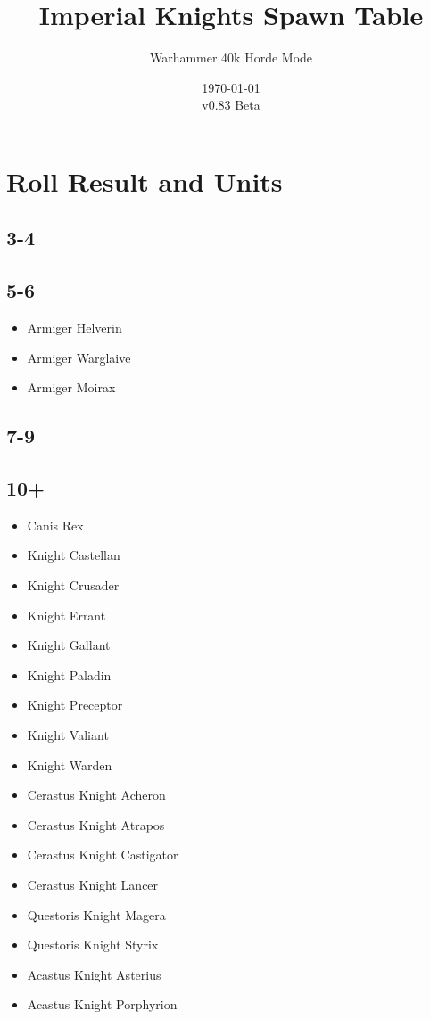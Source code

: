 \documentclass{HordeModeTarot}
\title{Imperial Knights Spawn Table}
\author{Warhammer 40k Horde Mode}
\date{\today \\v0.83 Beta}
\begin{document}
\maketitle

\outputUsingSpawnTableBoilerplate
\section{Roll Result and Units}\hypertarget{roll-results}{}\label{roll-results}

\begin{multicols}{2}

\subsection*{3-4}

\subsection*{5-6}

\begin{itemize}[leftmargin=*]
\item[] Armiger Helverin
\item[] Armiger Warglaive
\item[] Armiger Moirax
\end{itemize}

\subsection*{7-9}

\subsection*{10+}

\begin{itemize}[leftmargin=*]
\item[] Canis Rex
\item[] Knight Castellan
\item[] Knight Crusader
\item[] Knight Errant
\item[] Knight Gallant
\item[] Knight Paladin
\item[] Knight Preceptor
\item[] Knight Valiant
\item[] Knight Warden
\item[] Cerastus Knight Acheron
\item[] Cerastus Knight Atrapos
\item[] Cerastus Knight Castigator
\item[] Cerastus Knight Lancer
\item[] Questoris Knight Magera
\item[] Questoris Knight Styrix
\item[] Acastus Knight Asterius
\item[] Acastus Knight Porphyrion
\end{itemize}


\end{multicols}
\end{document}
